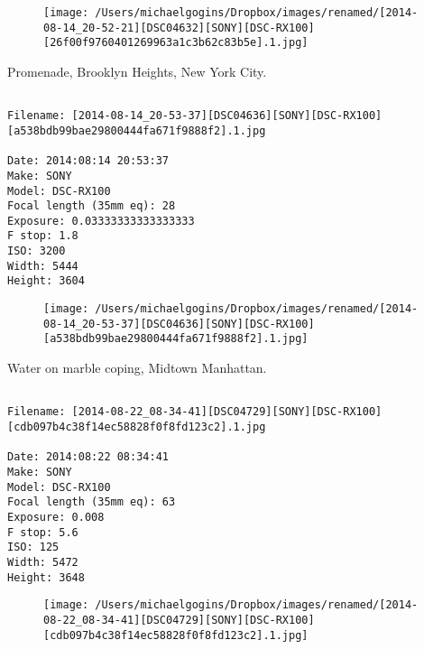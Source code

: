 \documentclass[11pt,letter,DIV=14,paper=landscape]{scrbook}
\begin{document}
\begin{figure}
\texttt{[image: /Users/michaelgogins/Dropbox/images/renamed/[2014-08-14\_20-52-21][DSC04632][SONY][DSC-RX100][26f00f9760401269963a1c3b62c83b5e].1.jpg]}
\end{figure}
    
\clearpage
\noindent Promenade, Brooklyn Heights, New York City.
\noindent
\begin{lstlisting}

Filename: [2014-08-14_20-53-37][DSC04636][SONY][DSC-RX100][a538bdb99bae29800444fa671f9888f2].1.jpg

Date: 2014:08:14 20:53:37
Make: SONY
Model: DSC-RX100
Focal length (35mm eq): 28
Exposure: 0.03333333333333333
F stop: 1.8
ISO: 3200
Width: 5444
Height: 3604
\end{lstlisting}
\clearpage

\begin{figure}
\texttt{[image: /Users/michaelgogins/Dropbox/images/renamed/[2014-08-14\_20-53-37][DSC04636][SONY][DSC-RX100][a538bdb99bae29800444fa671f9888f2].1.jpg]}
\end{figure}
    
\clearpage
\noindent Water on marble coping, Midtown Manhattan.
\noindent
\begin{lstlisting}

Filename: [2014-08-22_08-34-41][DSC04729][SONY][DSC-RX100][cdb097b4c38f14ec58828f0f8fd123c2].1.jpg

Date: 2014:08:22 08:34:41
Make: SONY
Model: DSC-RX100
Focal length (35mm eq): 63
Exposure: 0.008
F stop: 5.6
ISO: 125
Width: 5472
Height: 3648
\end{lstlisting}
\clearpage

\begin{figure}
\texttt{[image: /Users/michaelgogins/Dropbox/images/renamed/[2014-08-22\_08-34-41][DSC04729][SONY][DSC-RX100][cdb097b4c38f14ec58828f0f8fd123c2].1.jpg]}
\end{figure}
    
\end{document}
